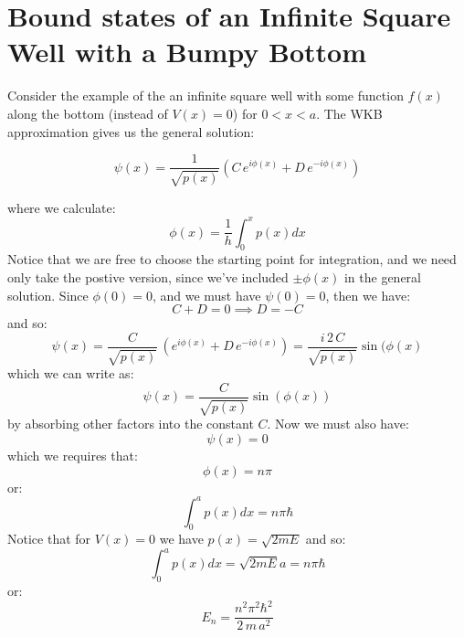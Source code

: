 \documentclass[12pt]{book}
\begin{document}
\section{Bound states of an Infinite Square Well with a Bumpy Bottom}

Consider the example of the an infinite square well with some function $f(x)$ along the bottom (instead of $V(x)=0$) for $0 < x < a$.  The WKB approximation gives us the general solution:

$$\psi(x)=\frac{1}{\sqrt{p(x)}}\left(C\,e^{\displaystyle i\phi(x)} 
+ D\,e^{\displaystyle -i\phi(x)}\right)$$

where we calculate:
$$\phi(x) = \frac{1}{h}\int_0^x p(x) dx$$
Notice that we are free to choose the starting point for integration, and we need only take the postive version, since we've included $\pm\phi(x)$ in the general solution. 
Since $\phi(0)=0$, and we must have $\psi(0)=0$, then we have:
$$C+D=0 \implies D = -C$$
and so:
$$\psi(x) = \frac{C}{\sqrt{p(x)}}\,\left(e^{\displaystyle i\phi(x)} 
+ D\,e^{\displaystyle -i\phi(x)}\right)
= \frac{i\,2\,C}{\sqrt{p(x)}}\sin(\phi(x)
$$
which we can write as:
$$\psi(x) = \frac{C}{\sqrt{p(x)}}\sin(\phi(x))$$
by absorbing other factors into the constant $C$.  Now we must also have:
$$\psi(x)=0$$
which we requires that:
$$\phi(x) = n\pi$$
or:
$$\int_0^a p(x) dx = n\pi \hbar$$
Notice that for $V(x)=0$ we have $p(x) = \sqrt{2mE}$ and so:
$$\int_0^a p(x) dx = \sqrt{2mE}a = n \pi \hbar$$
or:
$$E_n = \frac{n^2 \pi^2 \hbar^2}{2\,m\,a^2}$$
\end{document}
